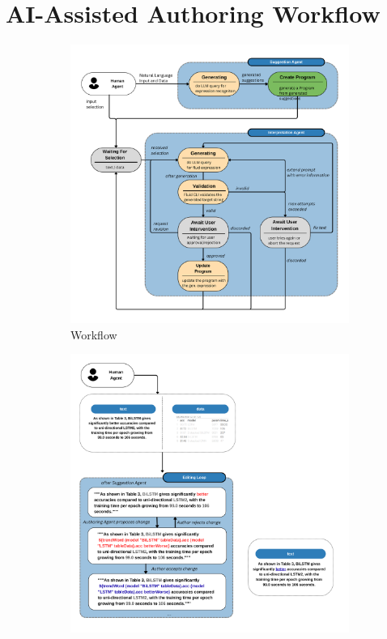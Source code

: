 \section{AI-Assisted Authoring Workflow}
\label{sec:authoring-workflow}

\begin{figure}[ht]
    \centering
    \begin{subfigure}{0.48\linewidth}
        \centering
        \includegraphics[width=\linewidth]{fig/entire-workflow}
        \caption{Workflow}
        \label{fig:architecture}
    \end{subfigure}\hfill
    \begin{subfigure}{0.48\linewidth}
        \centering
        \includegraphics[width=\linewidth]{fig/data-flow}

\end{subfigure}
\end{figure}
